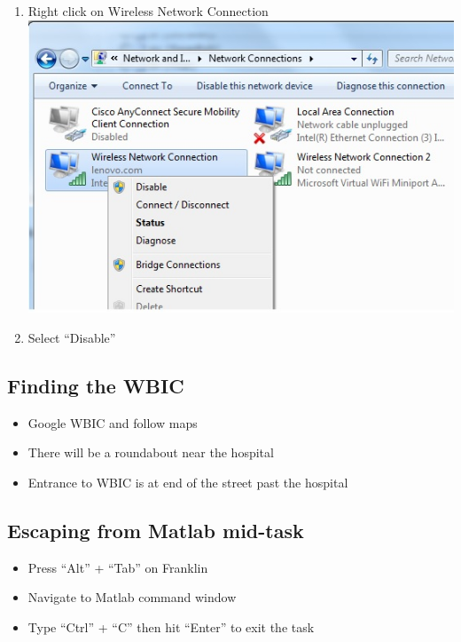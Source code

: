 \documentclass[
]{book}
\providecommand{\tightlist}{%
  \setlength{\itemsep}{0pt}\setlength{\parskip}{0pt}}
\begin{document}
\begin{enumerate}
\item
  Right click on Wireless Network Connection\\
  \includegraphics{images/scan_protocol/4.jpg}
\item
  Select ``Disable''
\end{enumerate}

\hypertarget{finding-the-wbic}{%
\subsection{Finding the WBIC}\label{finding-the-wbic}}

\begin{itemize}
\tightlist
\item
  Google WBIC and follow maps
\item
  There will be a roundabout near the hospital
\item
  Entrance to WBIC is at end of the street past the hospital
\end{itemize}

\hypertarget{escaping-from-matlab-mid-task}{%
\subsection{Escaping from Matlab mid-task}\label{escaping-from-matlab-mid-task}}

\begin{itemize}
\tightlist
\item
  Press ``Alt'' + ``Tab'' on Franklin
\item
  Navigate to Matlab command window
\item
  Type ``Ctrl'' + ``C'' then hit ``Enter'' to exit the task
\end{itemize}
\end{document}
